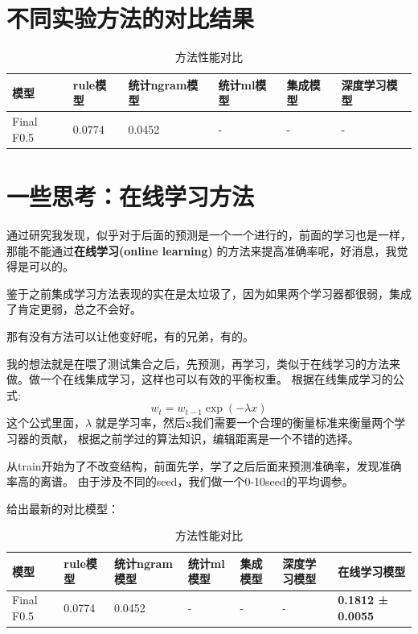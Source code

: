 \documentclass[answers]{exam}  %
\begin{document}
\section{不同实验方法的对比结果}

\begin{table}[H]
    \centering
    \begin{tabular}{llllll}
    \toprule
    \textbf{模型} & \textbf{rule模型} & \textbf{统计ngram模型} & \textbf{统计ml模型} & \textbf{集成模型} & \textbf{深度学习模型}\\
    \midrule
    Final F0.5 & 0.0774 & 0.0452 & - & - & - \\
    \bottomrule
    \end{tabular}
    \caption{方法性能对比}
    \end{table}

\section{一些思考：在线学习方法}

通过研究我发现，似乎对于后面的预测是一个一个进行的，前面的学习也是一样，那能不能通过\textbf{在线学习(online learning)}
的方法来提高准确率呢，好消息，我觉得是可以的。

鉴于之前集成学习方法表现的实在是太垃圾了，因为如果两个学习器都很弱，集成了肯定更弱，总之不会好。

那有没有方法可以让他变好呢，有的兄弟，有的。

我的想法就是在喂了测试集合之后，先预测，再学习，类似于在线学习的方法来做。做一个在线集成学习，这样也可以有效的平衡权重。
根据在线集成学习的公式:
\[ w_t = w_{t-1} \exp(-\lambda x) \]
这个公式里面，$\lambda$ 就是学习率，然后x我们需要一个合理的衡量标准来衡量两个学习器的贡献，
根据之前学过的算法知识，编辑距离是一个不错的选择。

从train开始为了不改变结构，前面先学，学了之后后面来预测准确率，发现准确率高的离谱。
由于涉及不同的seed，我们做一个0-10seed的平均调参。

给出最新的对比模型：

\begin{table}[h]
    \centering
    \begin{tabular}{lllllll}
    \toprule
    \textbf{模型} & \textbf{rule模型} & \textbf{统计ngram模型} & \textbf{统计ml模型} & \textbf{集成模型} & \textbf{深度学习模型} &\textbf{在线学习模型}\\
    \midrule
    Final F0.5 & 0.0774 & 0.0452 & - & - & - & \textbf{0.1812 ± 0.0055} \\
    \bottomrule
    \end{tabular}
    \caption{方法性能对比}
    \end{table}
\end{document}
